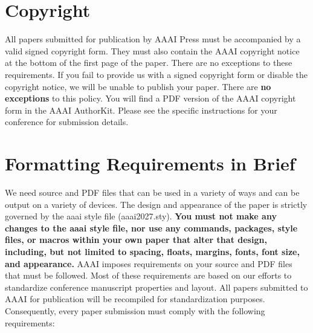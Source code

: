 \section{Copyright}
All papers submitted for publication by AAAI Press must be accompanied by a valid signed copyright form. They must also contain the AAAI copyright notice at the bottom of the first page of the paper. There are no exceptions to these requirements. If you fail to provide us with a signed copyright form or disable the copyright notice, we will be unable to publish your paper. There are \textbf{no exceptions} to this policy. You will find a PDF version of the AAAI copyright form in the AAAI AuthorKit. Please see the specific instructions for your conference for submission details.

\section{Formatting Requirements in Brief}
We need source and PDF files that can be used in a variety of ways and can be output on a variety of devices. The design and appearance of the paper is strictly governed by the aaai style file (aaai2027.sty).
\textbf{You must not make any changes to the aaai style file, nor use any commands, packages, style files, or macros within your own paper that alter that design, including, but not limited to spacing, floats, margins, fonts, font size, and appearance.} AAAI imposes requirements on your source and PDF files that must be followed. Most of these requirements are based on our efforts to standardize conference manuscript properties and layout. All papers submitted to AAAI for publication will be recompiled for standardization purposes. Consequently, every paper submission must comply with the following requirements:

